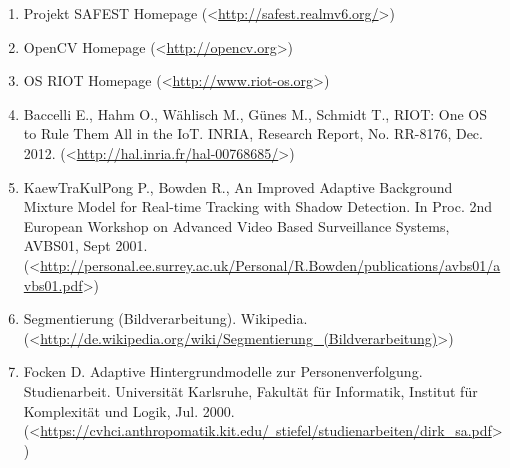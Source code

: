 \documentclass[10pt,a4paper]{article}
\begin{document}
\vspace*{1.5cm}

\begin{enumerate} 

\item Projekt SAFEST Homepage (\textless\href{http://safest.realmv6.org/}{http://safest.realmv6.org/}\textgreater)
\item OpenCV Homepage (\textless\href{http://opencv.org}{http://opencv.org}\textgreater)
\item OS RIOT Homepage (\textless\href{http://www.riot-os.org}{http://www.riot-os.org}\textgreater)

\item Baccelli E., Hahm O., Wählisch M., Günes M., Schmidt T., RIOT: One OS to Rule Them All in the IoT. INRIA, Research Report, No. RR-8176, Dec. 2012. \newline (\textless\href{http://hal.inria.fr/hal-00768685/}{http://hal.inria.fr/hal-00768685/}\textgreater)

\item KaewTraKulPong P., Bowden R., An Improved Adaptive Background Mixture Model for Real-time Tracking with Shadow Detection. In Proc. 2nd European Workshop on Advanced Video Based Surveillance Systems, AVBS01, Sept 2001. \newline (\textless\href{http://personal.ee.surrey.ac.uk/Personal/R.Bowden/publications/avbs01/avbs01.pdf}{http://personal.ee.surrey.ac.uk/Personal/R.Bowden/publications/avbs01/avbs01.pdf}\textgreater)

\item Segmentierung (Bildverarbeitung). Wikipedia. \newline (\textless\href{http://de.wikipedia.org/wiki/Segmentierung\_(Bildverarbeitung)}{http://de.wikipedia.org/wiki/Segmentierung\_(Bildverarbeitung)}\textgreater)

\item Focken D. Adaptive Hintergrundmodelle zur Personenverfolgung. Studienarbeit. Universität Karlsruhe, Fakultät für Informatik, Institut für Komplexität und Logik, Jul. 2000. \newline (\textless\href{https://cvhci.anthropomatik.kit.edu/~stiefel/studienarbeiten/dirk\_sa.pdf}{https://cvhci.anthropomatik.kit.edu/~stiefel/studienarbeiten/dirk\_sa.pdf}\textgreater)

\end{enumerate}
\end{document}
